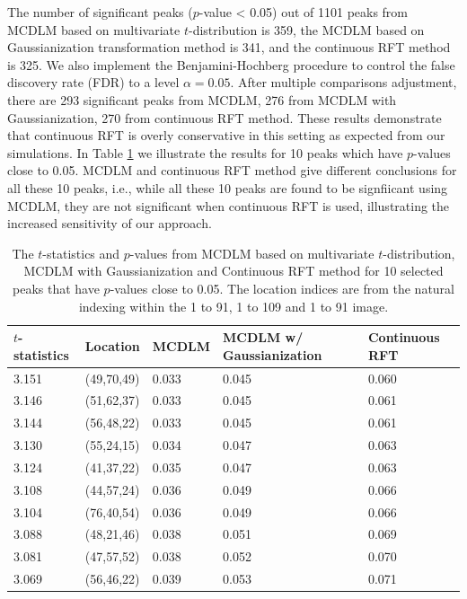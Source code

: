 \documentclass{article}
\begin{document}
The number of significant peaks ($p$-value < 0.05) out of 1101 peaks from MCDLM based on multivariate $t$-distribution is 359, the MCDLM based on Gaussianization transformation method is 341, and the continuous RFT method is 325. We also implement the Benjamini-Hochberg procedure \citep{benjamini1995controlling} to control the false discovery rate (FDR) to a level $\alpha = 0.05$. After multiple comparisons adjustment, there are 293 significant peaks from MCDLM, 276 from MCDLM with Gaussianization, 270 from continuous RFT method. These results demonstrate that continuous RFT is overly conservative in this setting as expected from our simulations. In Table \ref{tab.hcp} we illustrate the results for 10 peaks which have $p$-values close to 0.05. MCDLM and continuous RFT method give different conclusions for all these 10 peaks, i.e., while all these 10 peaks are found to be signfiicant using MCDLM, they are not significant when continuous RFT is used, illustrating the increased sensitivity of our approach. 

\begin{table}[!htp]
\caption{The $t$-statistics and $p$-values from MCDLM based on multivariate $t$-distribution, MCDLM with Gaussianization and Continuous RFT method for 10 selected peaks that have $p$-values close to 0.05. The location indices are from the natural indexing within the 1 to 91, 1 to 109 and 1 to 91 image. \label{tab.hcp}}
\centering
\begin{tabular}{lllll}
\hline
$t$-statistics & Location & MCDLM & MCDLM w/ Gaussianization & Continuous RFT\\ \hline
3.151 & (49,70,49) & 0.033 & 0.045 & 0.060 \\ 
3.146 & (51,62,37) & 0.033 & 0.045 & 0.061 \\ 
3.144 & (56,48,22) & 0.033 & 0.045 & 0.061 \\ 
3.130 & (55,24,15) & 0.034 & 0.047 & 0.063 \\ 
3.124 & (41,37,22) & 0.035 & 0.047 & 0.063 \\ 
3.108 & (44,57,24) & 0.036 & 0.049 & 0.066 \\ 
3.104 & (76,40,54) & 0.036 & 0.049 & 0.066 \\ 
3.088 & (48,21,46) & 0.038 & 0.051 & 0.069 \\ 
3.081 & (47,57,52) & 0.038 & 0.052 & 0.070 \\ 
3.069 & (56,46,22) & 0.039 & 0.053 & 0.071 \\ \hline
\end{tabular}
\end{table}
\end{document}
